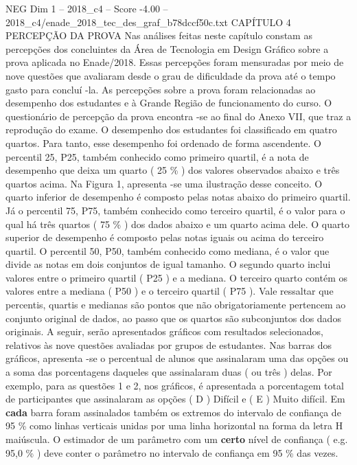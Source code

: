 \begin{textsample}{NEG Dim 1 – 2018\_c4 – Score -4.00 – 2018\_c4/enade\_2018\_tec\_des\_graf\_b78dccf50c.txt}  \label{ex:f1_neg_133}
CAPÍTULO 4 PERCEPÇÃO DA PROVA Nas análises feitas neste capítulo constam as percepções dos concluintes da Área de Tecnologia em Design Gráfico sobre a prova aplicada no Enade/2018.
Essas percepções foram mensuradas por meio de nove questões que avaliaram desde o grau de dificuldade da prova até o tempo gasto para concluí -la.
As percepções sobre a prova foram relacionadas ao desempenho dos estudantes e à Grande Região de funcionamento do curso.
O questionário de percepção da prova encontra -se ao final do Anexo VII, que traz a reprodução do exame.
O desempenho dos estudantes foi classificado em quatro quartos.
Para tanto, esse desempenho foi ordenado de forma ascendente.
O percentil 25, P25, também conhecido como primeiro quartil, é a nota de desempenho que deixa um quarto ( 25 \% ) dos valores observados abaixo e três quartos acima.
Na Figura 1, apresenta -se uma ilustração desse conceito.
O quarto inferior de desempenho é composto pelas notas abaixo do primeiro quartil.
Já o percentil 75, P75, também conhecido como terceiro quartil, é o valor para o qual há três quartos ( 75 \% ) dos dados abaixo e um quarto acima dele.
O quarto superior de desempenho é composto pelas notas iguais ou acima do terceiro quartil.
O percentil 50, P50, também conhecido como mediana, é o valor que divide as notas em dois conjuntos de igual tamanho.
O segundo quarto inclui valores entre o primeiro quartil ( P25 ) e a mediana.
O terceiro quarto contém os valores entre a mediana ( P50 ) e o terceiro quartil ( P75 ).
Vale ressaltar que percentis, quartis e medianas são pontos que não obrigatoriamente pertencem ao conjunto original de dados, ao passo que os quartos são subconjuntos dos dados originais.
A seguir, serão apresentados gráficos com resultados selecionados, relativos às nove questões avaliadas por grupos de estudantes.
Nas barras dos gráficos, apresenta -se o percentual de alunos que assinalaram uma das opções ou a soma das porcentagens daqueles que assinalaram duas ( ou três ) delas.
Por exemplo, para as questões 1 e 2, nos gráficos, é apresentada a porcentagem total de participantes que assinalaram as opções ( D ) Difícil e ( E ) Muito difícil.
Em \textbf{cada} barra foram assinalados também os extremos do intervalo de confiança de 95 \% como linhas verticais unidas por uma linha horizontal na forma da letra H maiúscula.
O estimador de um parâmetro com um \textbf{certo} nível de confiança ( e.g. 95,0 \% ) deve conter o parâmetro no intervalo de confiança em 95 \% das vezes.

\end{textsample}
